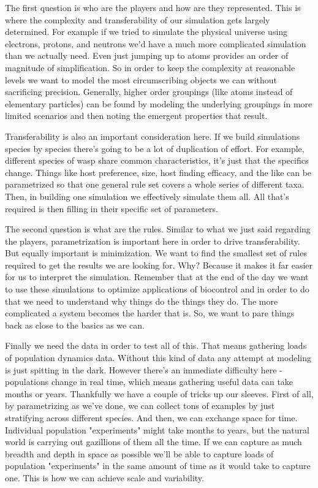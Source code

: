 \documentclass[11pt,a5paper]{book}
\begin{document}
The first question is who are the players and how are they represented. This is where the complexity and transferability of our simulation gets largely determined. For example if we tried to simulate the physical universe using electrons, protons, and neutrons we'd have a much more complicated simulation than we actually need. Even just jumping up to atoms provides an order of magnitude of simplification. So in order to keep the complexity at reasonable levels we want to model the most circumscribing objects we can without sacrificing precision. Generally, higher order groupings (like atoms instead of elementary particles) can be found by modeling the underlying groupings in more limited scenarios and then noting the emergent properties that result. 
\newline

Transferability is also an important consideration here. If we build simulations species by species there's going to be a lot of duplication of effort. For example, different species of wasp share common characteristics, it's just that the specifics change. Things like host preference, size, host finding efficacy, and the like can be parametrized so that one general rule set covers a whole series of different taxa. Then, in building one simulation we effectively simulate them all. All that's required is then filling in their specific set of parameters.
\newline

The second question is what are the rules. Similar to what we just said regarding the players, parametrization is important here in order to drive transferability. But equally important is minimization. We want to find the smallest set of rules required to get the results we are looking for. Why? Because it makes it far easier for us to interpret the simulation. Remember that at the end of the day we want to use these simulations to optimize applications of biocontrol and in order to do that we need to understand why things do the things they do. The more complicated a system becomes the harder that is. So, we want to pare things back as close to the basics as we can.
\newline

Finally we need the data in order to test all of this. That means gathering loads of population dynamics data. Without this kind of data any attempt at modeling is just spitting in the dark. However there's an immediate difficulty here - populations change in real time, which means gathering useful data can take months or years. Thankfully we have a couple of tricks up our sleeves. First of all, by parametrizing as we've done, we can collect tons of examples by just stratifying across different species. And then, we can exchange space for time. Individual population "experiments" might take months to years, but the natural world is carrying out gazillions of them all the time. If we can capture as much breadth and depth in space as possible we'll be able to capture loads of population "experiments" in the same amount of time as it would take to capture one. This is how we can achieve scale and variability.
\newline
\end{document}
